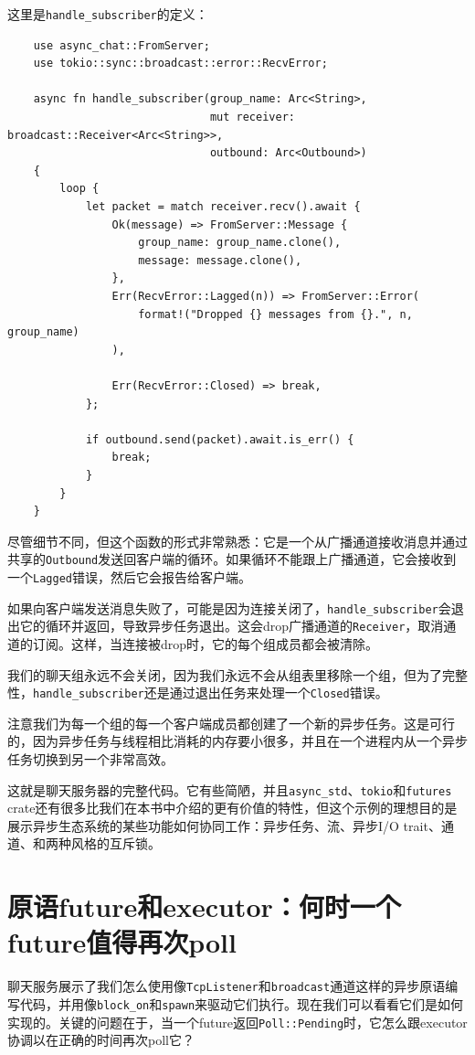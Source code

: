 这里是\texttt{handle\_subscriber}的定义：
\begin{verbatim}
    use async_chat::FromServer;
    use tokio::sync::broadcast::error::RecvError;

    async fn handle_subscriber(group_name: Arc<String>,
                               mut receiver: broadcast::Receiver<Arc<String>>,
                               outbound: Arc<Outbound>)
    {
        loop {
            let packet = match receiver.recv().await {
                Ok(message) => FromServer::Message {
                    group_name: group_name.clone(),
                    message: message.clone(),
                },
                Err(RecvError::Lagged(n)) => FromServer::Error(
                    format!("Dropped {} messages from {}.", n, group_name)
                ),

                Err(RecvError::Closed) => break,
            };

            if outbound.send(packet).await.is_err() {
                break; 
            }
        }
    }
\end{verbatim}

尽管细节不同，但这个函数的形式非常熟悉：它是一个从广播通道接收消息并通过共享的\texttt{Outbound}发送回客户端的循环。如果循环不能跟上广播通道，它会接收到一个\texttt{Lagged}错误，然后它会报告给客户端。

如果向客户端发送消息失败了，可能是因为连接关闭了，\texttt{handle\_subscriber}会退出它的循环并返回，导致异步任务退出。这会drop广播通道的\texttt{Receiver}，取消通道的订阅。这样，当连接被drop时，它的每个组成员都会被清除。

我们的聊天组永远不会关闭，因为我们永远不会从组表里移除一个组，但为了完整性，\texttt{handle\_subscriber}还是通过退出任务来处理一个\texttt{Closed}错误。

注意我们为每一个组的每一个客户端成员都创建了一个新的异步任务。这是可行的，因为异步任务与线程相比消耗的内存要小很多，并且在一个进程内从一个异步任务切换到另一个非常高效。

这就是聊天服务器的完整代码。它有些简陋，并且\texttt{async\_std}、\texttt{tokio}和\texttt{futures} crate还有很多比我们在本书中介绍的更有价值的特性，但这个示例的理想目的是展示异步生态系统的某些功能如何协同工作：异步任务、流、异步I/O trait、通道、和两种风格的互斥锁。

\section{原语future和executor：何时一个future值得再次poll}\label{WhenPoll}
聊天服务展示了我们怎么使用像\texttt{TcpListener}和\texttt{broadcast}通道这样的异步原语编写代码，并用像\texttt{block\_on}和\texttt{spawn}来驱动它们执行。现在我们可以看看它们是如何实现的。关键的问题在于，当一个future返回\texttt{Poll::Pending}时，它怎么跟executor协调以在正确的时间再次poll它？

